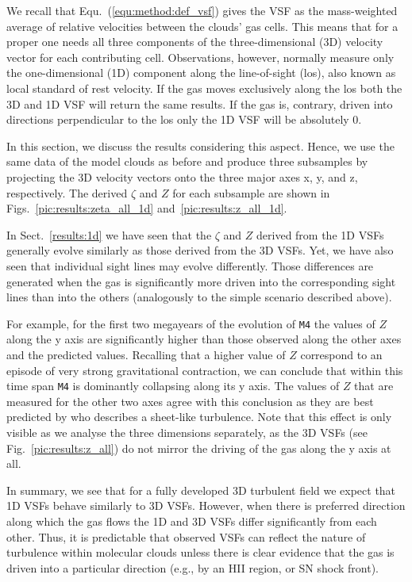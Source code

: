 We recall that Equ.~(\ref{equ:method:def_vsf}) gives the VSF  as the mass-weighted average of relative velocities between the clouds' gas cells.
This means that for a proper one needs all three components of the three-dimensional (3D) velocity vector for each contributing cell.
Observations, however, normally measure only the one-dimensional (1D) component along the line-of-sight (los), also known as local standard of rest velocity.
If the gas moves exclusively along the los both the 3D and 1D VSF will return the same results. 
If the gas is, contrary, driven into directions perpendicular to the los only the 1D VSF will be absolutely 0.
 
In this section, we discuss the results considering this aspect.
Hence, we use the same data of the model clouds as before and produce three subsamples by projecting the 3D velocity vectors onto the three  major axes x, y, and z, respectively.
The derived $\zeta$ and $Z$ for each subsample are shown in Figs.~\ref{pic:results:zeta_all_1d} and~\ref{pic:results:z_all_1d}.

In Sect.~\ref{results:1d} we have seen that the $\zeta$ and $Z$ derived from the 1D VSFs generally evolve similarly as those derived from the 3D VSFs.
Yet, we have also seen that individual sight lines may evolve differently.
Those differences are generated when the gas is significantly more driven into the corresponding sight lines than into the others (analogously to the simple scenario described above). 

For example, for the first two megayears of the evolution of \texttt{M4} the values of $Z$ along the y axis are significantly higher than those observed along the other axes and the predicted values.
Recalling that a higher value of $Z$ correspond to an episode of very strong gravitational contraction, we can conclude that within this time span \texttt{M4} is dominantly collapsing along its y axis. 
The values of $Z$ that are measured for the other two axes agree with this conclusion as they are best predicted by \citet{Boldyrev2002} who describes a sheet-like turbulence. 
Note that this effect is only visible as we analyse the three dimensions separately, as the 3D VSFs (see Fig.~\ref{pic:results:z_all}) do not mirror the driving of the gas along the y axis at all.

In summary, we see that for a fully developed 3D turbulent field we expect that 1D VSFs behave similarly to 3D VSFs.
However, when there is preferred direction along which the gas flows the 1D and 3D VSFs differ significantly from each other. 
Thus, it is predictable that observed VSFs can reflect the nature of turbulence within molecular clouds unless there is clear evidence that the gas is driven into a particular direction (e.g., by an HII region, or SN shock front).


